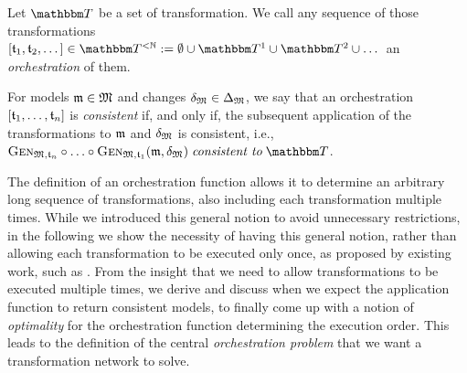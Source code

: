 \begin{definition}[Orchestration]
    Let $\transformationset{T}$ be a set of transformation.
    We call any sequence of those transformations $\sequenced{\transformation{t}_{1}, \transformation{t}_{2}, \dots} \in \transformationset{T}^{< \mathbb{N}} \equalsperdefinition \emptyset \cup \transformationset{T}^1 \cup \transformationset{T}^2 \cup \dots$ an \emph{orchestration} of them.

    For models $\mathfrak{m} \in \mathfrak{M}$ and changes $\mathfrak{\delta}_{\mathfrak{M}} \in \Delta_{\mathfrak{M}}$, we say that an orchestration $[\mathfrak{t}_{1}, \dots, \mathfrak{t}_{n}]$ is \emph{consistent} if, and only if, the subsequent application of the transformations to $\mathfrak{m}$ and $\mathfrak{\delta}_{\mathfrak{M}}$  is consistent, i.e., $\generalizationfunction{\metamodeltuple{M},\transformation{t}_{n}} \concatfunction \dots \concatfunction \generalizationfunction{\metamodeltuple{M},\transformation{t}_{1}}(\modeltuple{m}, \changetuple{\metamodeltuple{M}}) \consistenttomath \transformationset{T}$.
\end{definition}

The definition of an orchestration function allows it to determine an arbitrary long sequence of transformations, also including each transformation multiple times.
While we introduced this general notion to avoid unnecessary restrictions, in the following we show the necessity of having this general notion, rather than allowing each transformation to be executed only once, as proposed by existing work, such as \cite{stevens2020BidirectionalTransformationLarge-SoSym}.
From the insight that we need to allow transformations to be executed multiple times, we derive and discuss when we expect the application function to return consistent models, to finally come up with a notion of \emph{optimality} for the orchestration function determining the execution order.
This leads to the definition of the central \emph{orchestration problem} that we want a transformation network to solve.


